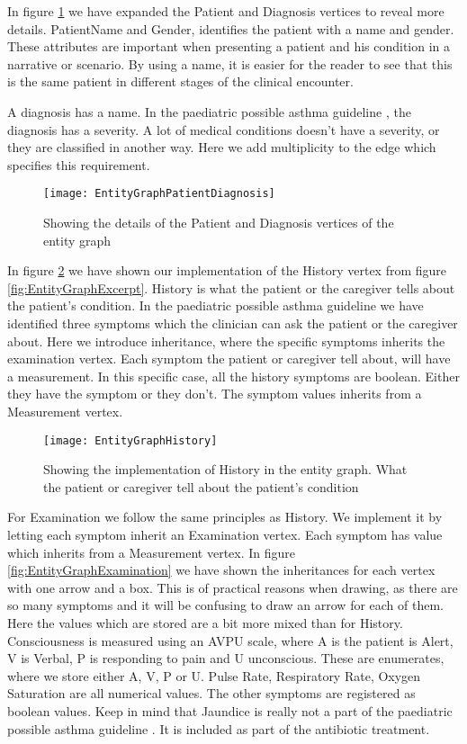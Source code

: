 In figure \ref{fig:EntityGraphPatientDiagnosis} we have expanded the Patient and Diagnosis vertices to reveal more details. PatientName and Gender, identifies the patient with a name and gender. These attributes are important when presenting a patient and his condition in a narrative or scenario. By using a name, it is easier for the reader to see that this is the same patient in different stages of the clinical encounter.

A diagnosis has a name. In the paediatric possible asthma guideline \parencite{RepublicofKeny2016}, the diagnosis has a severity. A lot of medical conditions doesn't have a severity, or they are classified in another way. Here we add multiplicity to the edge which specifies this requirement. 
\begin{figure}[h!]
	\caption {Showing the details of the Patient and Diagnosis vertices of the entity graph}
	\label{fig:EntityGraphPatientDiagnosis}
	\texttt{[image: EntityGraphPatientDiagnosis]}
\end{figure}

In figure \ref{fig:EntityGraphHistory} we have shown our implementation of the History vertex from figure \ref{fig:EntityGraphExcerpt}. History is what the patient or the caregiver tells about the patient's condition. In the paediatric possible asthma guideline \parencite{RepublicofKeny2016} we have identified three symptoms which the clinician can ask the patient or the caregiver about. Here we introduce inheritance, where the specific symptoms inherits the examination vertex. Each symptom the patient or caregiver tell about, will have a measurement. In this specific case, all the history symptoms are boolean. Either they have the symptom or they don't. The symptom values inherits from a Measurement vertex.

\begin{figure}[h!]
	\caption {Showing the implementation of History in the entity graph. What the patient or caregiver tell about the patient's condition}
	\label{fig:EntityGraphHistory}
	\texttt{[image: EntityGraphHistory]}
\end{figure}

For Examination we follow the same principles as History. We implement it by letting each symptom inherit an Examination vertex. Each symptom has value which inherits from a Measurement vertex. In figure \ref{fig:EntityGraphExamination} we have shown the inheritances for each vertex with one arrow and a box. This is of practical reasons when drawing, as there are so many symptoms and it will be confusing to draw an arrow for each of them. Here the values which are stored are a bit more mixed than for History. Consciousness is measured using an AVPU scale, where A is the patient is Alert, V is Verbal, P is responding to pain and U unconscious. These are enumerates, where we store either A, V, P or U. Pulse Rate, Respiratory Rate, Oxygen Saturation are all numerical values. The other symptoms are registered as boolean values. Keep in mind that Jaundice is really not a part of the paediatric possible asthma guideline \parencite{RepublicofKeny2016}. It is included as part of the antibiotic treatment.


